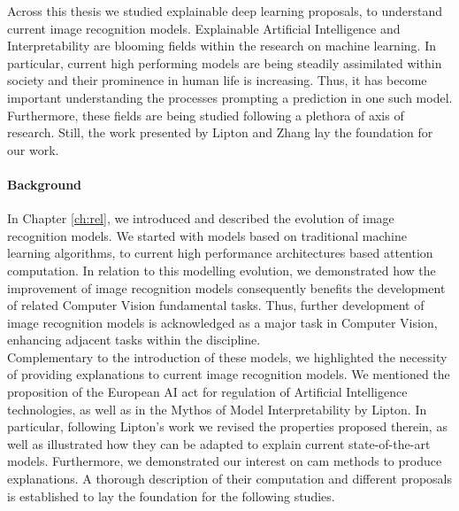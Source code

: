\label{concs}
Across this thesis we studied explainable deep learning proposals, to understand current image 
recognition models. Explainable Artificial Intelligence and Interpretability are blooming fields 
within the research on machine learning. In particular, current high performing models are 
being steadily assimilated within society and their prominence in human life is increasing. Thus, 
it has become important understanding the processes prompting a prediction in one such model. 
Furthermore, these fields are being studied following a plethora of axis of research. Still, the 
work presented by Lipton \autocite{mythos_interp} and Zhang \autocite{zhang2021survey} lay the 
foundation for our work.\\

\paragraph{Background}
\noindent In Chapter \ref{ch:rel}, we introduced and described the evolution of image recognition 
models. We started with models based on traditional machine learning algorithms, to current high 
performance architectures based attention computation. In relation to this modelling evolution, we 
demonstrated how the improvement of image recognition models consequently benefits the development 
of related Computer Vision fundamental tasks. Thus, further development of image recognition models 
is acknowledged as a major task in Computer Vision, enhancing adjacent tasks within the discipline.\\

\noindent Complementary to the introduction of these models, we highlighted the 
necessity of providing explanations to current image recognition models. We mentioned the proposition  
of the European AI act for regulation of Artificial Intelligence technologies, as well as in the 
Mythos of Model Interpretability by Lipton. In particular, following Lipton's work we 
revised the properties proposed therein, as well as illustrated how they can be adapted to explain 
current state-of-the-art models. Furthermore, we demonstrated our interest on \gls{cam} methods 
to produce explanations. A thorough description of their computation and different proposals is 
established to lay the foundation for the following studies.\\

